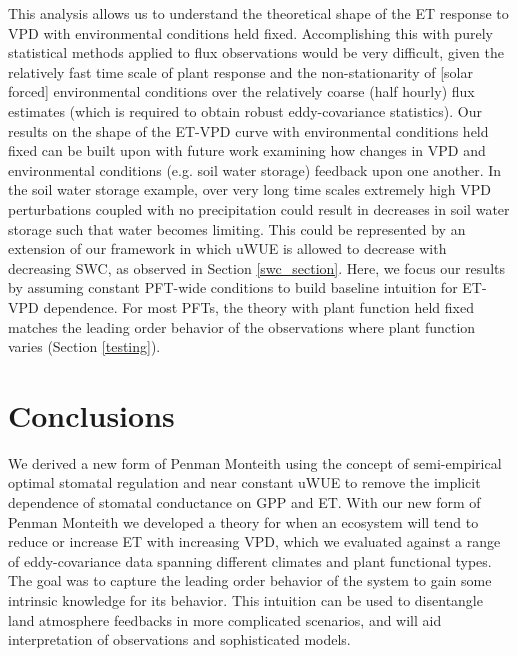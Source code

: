 This analysis allows us to understand the theoretical shape of the ET
response to VPD with environmental conditions held
fixed. Accomplishing this with purely statistical
methods applied to flux observations would be very difficult, given
the relatively fast time scale of plant response and the
non-stationarity of [solar forced] environmental conditions over the
relatively coarse (half hourly) flux estimates (which is required to
obtain robust eddy-covariance statistics). Our results on the shape of
the ET-VPD curve with environmental conditions held
fixed can be built upon with future work examining how changes in VPD
and environmental conditions (e.g. soil water storage) feedback upon
one another. In the soil water storage example, over very long time
scales extremely high VPD perturbations coupled with no precipitation
could result in decreases in soil water storage such that water
becomes limiting. This could be represented by an extension of our
framework in which uWUE is allowed to decrease with decreasing SWC, as
observed in Section \ref{swc_section}. Here, we focus our results by
assuming constant PFT-wide conditions to build baseline intuition for
ET-VPD dependence. For most PFTs, the theory with plant function held
fixed matches the leading order behavior of the observations where
plant function varies (Section \ref{testing}).

\section{Conclusions}

We derived a new form of Penman Monteith using the concept of
semi-empirical optimal stomatal regulation \citep{Lin_2015,
  MEDLYN_2011} and near constant uWUE \citep{Zhou_2015} to remove the
implicit dependence of stomatal conductance on GPP and ET. With our
new form of Penman Monteith we developed a theory for when an
ecosystem will tend to reduce or increase ET with increasing VPD,
which we evaluated against a range of eddy-covariance data spanning
different climates and plant functional types. The goal was to capture
the leading order behavior of the system to gain some intrinsic
knowledge for its behavior. This intuition can be used to disentangle
land atmosphere feedbacks in more complicated scenarios, and will aid
interpretation of observations and sophisticated models.

